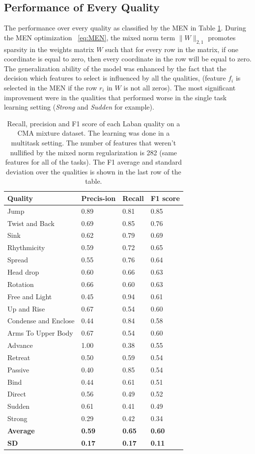\documentclass[11pt,twocolumn,varwidth=true,a4paper,fleqn]{sigchi}
\begin{document}
\subsection{Performance of Every Quality}
The performance over every quality as classified by the MEN in Table
\ref{mixedSummary}. During the MEN optimization ~\eqref{eq:MEN}, the mixed norm
term $\|W\|_{2,1}$  promotes sparsity in the weights matrix $W$ such that for
every row in the matrix, if one coordinate is equal to zero, then every coordinate
in the row will be equal to zero.
\\The generalization ability of the model was enhanced by the fact that the
decision which features to select is influenced by all the qualities, (feature $f_i$ is
selected in the MEN if the row $r_i$ in $W$ is not all zeros). The most
significant improvement were in the qualities that performed worse in the
single task learning setting (\textit{Strong} and \textit{Sudden} for example).
\begin{table}[!h]
\centering
\begin{tabular}{|p{3cm}|p{0.9cm}|p{0.9cm}|p{0.9cm}|}
\hline
Quality&Precis-ion&Recall&F1 score\\\hline
Jump&0.89&0.81&0.85\\\hline
Twist and Back&0.69&0.85&0.76\\\hline
Sink&0.62&0.79&0.69\\\hline
Rhythmicity&0.59&0.72&0.65\\\hline
Spread&0.55&0.76&0.64\\\hline
Head drop&0.60&0.66&0.63\\\hline
Rotation&0.66&0.60&0.63\\\hline
Free and Light&0.45&0.94&0.61\\\hline
Up and Rise&0.67&0.54&0.60\\\hline
Condense and Enclose&0.44&0.84&0.58\\\hline
Arms To Upper Body&0.67&0.54&0.60\\\hline
Advance&1.00&0.38&0.55\\\hline
Retreat&0.50&0.59&0.54\\\hline
Passive&0.40&0.85&0.54\\\hline
Bind&0.44&0.61&0.51\\\hline
Direct&0.56&0.49&0.52\\\hline
Sudden&0.61&0.41&0.49\\\hline
Strong&0.29&0.42&0.34\\\hline
\textbf{Average}&\textbf{0.59}&\textbf{0.65}&\textbf{0.60}\\\hline
\textbf{SD}&\textbf{0.17}&\textbf{0.17}&\textbf{0.11}\\\hline
\end{tabular}
\caption{Recall, precision and F1 score of each Laban quality on a CMA
mixture dataset. The learning was done in a multitask setting. The number of
features that weren't nullified by the mixed norm regularization is
282 (same features for all of the tasks). The F1 average and standard
deviation over the qualities is shown in the last row of the table.}
\label{mixedSummary}
\end{table}
\end{document}
